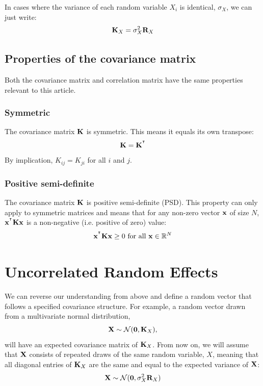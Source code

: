 \documentclass[12pt]{article}
\begin{document}
In cases where the variance of each random variable $X_i$ is identical, $\sigma_X$, we can just write:
$$ \mathbf{K}_X = \sigma_X^2 \mathbf{R}_X $$

\subsection{Properties of the covariance matrix}
Both the covariance matrix and correlation matrix have the same properties relevant to this article.

\subsubsection{Symmetric}
The covariance matrix $\mathbf{K}$ is symmetric.
This means it equals its own transpose:
$$\mathbf{K} = \mathbf{K}^{^\intercal} $$
By implication, $K_{ij} = K_{ji}$ for all $i$ and $j$.

\subsubsection{Positive semi-definite}
The covariance matrix $\mathbf{K}$ is positive semi-definite (PSD).
This property can only apply to symmetric matrices and means that for any non-zero vector $\mathbf{x}$ of size $N$, $\mathbf{x}^{^\intercal} \mathbf{K} \mathbf{x} $ is a non-negative (i.e. positive of zero) value:
$$ \mathbf{x}^{^\intercal} \mathbf{K} \mathbf{x} \geq 0 \text{ for all } \mathbf{x} \in \mathbb{R}^N $$

\section{Uncorrelated Random Effects}
We can reverse our understanding from above and define a random vector that follows a specified covariance structure.
For example, a random vector drawn from a multivariate normal distribution,
$$ \mathbf{X} \sim \mathcal{N} (\textbf{0}, \mathbf{K}_X) , $$
will have an expected covariance matrix of $\mathbf{K}_X$.
From now on, we will assume that $\mathbf{X}$ consists of repeated draws of the same random variable, $X$, meaning that all diagonal entries of $\mathbf{K}_X$ are the same and equal to the expected variance of $\mathbf{X}$:
$$ \mathbf{X} \sim \mathcal{N} (\textbf{0},\sigma_X^2 \mathbf{R}_X) $$
\end{document}
